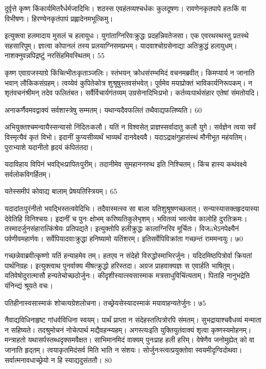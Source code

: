 दुर्वृत्ते कृष्ण किंकार्यमितरैर्धर्मजादिभिः।
शठस्स एवहंतव्यश्चर्धकः कुलदूषणः।
रावणेनकृतपापे हतःकिं वा विभीषणः।
हिरण्येनकृतंपापं प्रह्लादेनमभूत्किमु।

इत्युक्त्वा हलमादाय मुसलं च हलायुधः।
युगांताग्निरिवःक्रुद्धः प्रदहन्निवतेजसा।
एक एवरथस्थस्तु प्रतस्थे सहसारिपुम्।
ज्ञात्वा कोपानलं तस्य प्रलयाग्निसमप्रभम्।
यादवाश्चोग्रसेनाद्या अतिक्रुद्धं हलायुधम्।
नाशक्नुवन्नपिद्रष्टुं नरसिंहमिवस्थितम्।
55

कृष्ण एवाग्रजस्याग्रे किंचित्भीतःकृताञ्जलिः।
स्तंभयन् क्रोधसंरम्भमिदं वचनमब्रवीत्।
किमप्यार्य न जानाति भवान् लौकिकसंग्रहम्।
त्वय्येवं कुपितेकोत्र शुश्रूषुस्तवसंभवेत्।
पूर्वमेव मयाप्रोक्तं भाविकार्यनिरूपकम्।
न शृतंवचनंश्रीमन् तदेव फलितंबत।
सर्वैर्विचार्यगंतव्यम् उग्रसेनादिभिःप्रभो।
कर्तव्यःपार्थसंहार एतेषां संमतोयदि।

अनाकर्णैवमवद्वाक्यं सर्वशास्त्रेषु सम्मतम्।
यथान्यदैवफलितं तथैवाद्यफलिष्यति।
60

अभियुक्तश्चमन्वायैस्सन्यासो निंदितःकलौ।
यतिं न विश्वसेत् प्राज्ञस्सर्वादातु कलौ युगे।
सर्वज्ञेन त्वया सर्वं विस्मृत्यैवं कृतं विभो।
इदानीं कुप्यसीव्यर्थं भाव्यर्थं दानवेक्ष्यवै।
यदाऽद्राक्षंगुहासंस्थं मौनीभूत महंयतिम्।
पुराभ्याशे यदानीतो हृदयं कंपितंतदा।

यदाविहाय विपिनं भवद्भिःप्रापितःपुरीम्।
तदानीमेव सुमहाननरुथ इति निश्चितम्।
किंच हास्य कथंवक्ष्ये सर्वलोकविगर्हितम्।

यतेस्समीपं कोवाद्य बालाम् प्रेषयतिस्त्रियम्।
65

यदादांतःपुरंनीतो भवद्भिस्तत्ववेदिभिः।
तदैवास्मत्स्व सा बाला यतिशुश्रूषणच्छलात्।
सन्यास्यासक्तहृदयास्या देवेतिहि विनिश्चयः।
इदानीं च पुनः क्षोभम् करिष्यतिकुलेभृशम्।
भवितव्यं भवत्येव कालोहि दुरतिक्रमः।
तस्मादर्जुनसंहारात्किंश्रेयः प्रतिपद्यते।
इत्युक्तोपि हलीक्रुद्धः कालाग्निरिव मूर्चितः।
विजāभेऽनपेक्ष्यैनं पर्वणीवमहार्णवः।
सर्वेपियादवाःक्रुद्धा हनिष्यामो यतिंशरम्।
इतिसर्वेपिविक्रांता गच्छन्तं राममन्वयुः।
७0

गच्छन्नेवाब्रवीत्कृष्णो यतिं हन्याहमेव तम्।
हतएव न संदेहो विरुद्धोस्माभिरर्जुनः।
यदिदमिष्ठपित्रोर्वा क्रियतां पार्थनिग्रहः।
इत्युक्त्वाथ पुनर्वाक्य मीषत्क्रुद्धो हरिस्तदा।
अग्रज प्राहवाक्यज्ञः स एवार्हति भाषितुम्।
यतिवेषोदुरात्मासौ हन्यतेचोच्छठोर्जुनः।
कीदृशीस्यात्स्वसास्माक मत्रसाधुविचिंत्यताम्।
पिताहि नानुभद्रेति यंनिन्द्यं श्रूयते वचः।

पतिहीनास्वसास्माकं शोचत्यग्रेशलोचना।
तच्छ्रेयसेस्यादस्माकं मयावाहन्यतेर्जुनः।
७5

नैवाद्यविधिनाहृष्ट गांधर्वविधिना स्वयम्।
पार्थं प्राप्ता न संदेहस्तत्पित्रोरपि संमतम्।
सुभद्रायाश्चवैधव्यं मन्माता न सहिष्यते।
तदश्रुमोचनं नोचेत्पार्थ मद्यैवहन्म्यहम्।
अगस्त्यःइति युक्तियुतंवाक्यं शृत्वा कृष्णस्यमोहनम्।
मन्त्राहतो यथासर्पस्तब्धदृक्समवैक्षत।
साभिमानमिदं वाक्यम् पुनःप्राह हली हरिम्।
वेषेणैव जनोमुह्येत् को वा जानाति हृद्तम्।
त्वयाकृतमिदंसर्व मिति भाति न संशयः।
सोर्जुनःस्त्वत्प्रयुक्तोवा स्वयमीदृग्विदोथवा।
सर्वात्मनावधाच्छ्रेयो न हि स्याद्यदुसंततौ।
80


